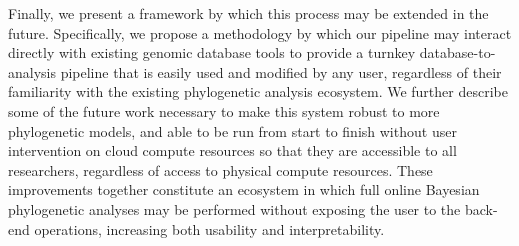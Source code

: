 Finally, we present a framework by which this process may be extended in the future. %
Specifically, we propose a methodology by which our pipeline may interact directly with existing genomic database tools to provide a turnkey database-to-analysis pipeline that is easily used and modified by any user, regardless of their familiarity with the existing phylogenetic analysis ecosystem.
We further describe some of the future work necessary to make this system robust to more phylogenetic models, and able to be run from start to finish without user intervention on cloud compute resources so that they are accessible to all researchers, regardless of access to physical compute resources.
These improvements together constitute an ecosystem in which full online Bayesian phylogenetic analyses may be performed without exposing the user to the back-end operations, increasing both usability and interpretability.

%


\cleardoublepage

